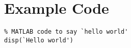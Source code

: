 \chapter{Example Code}\label{appendixa}

\begin{lstlisting}
% MATLAB code to say `hello world'
disp(`Hello world')
\end{lstlisting}

